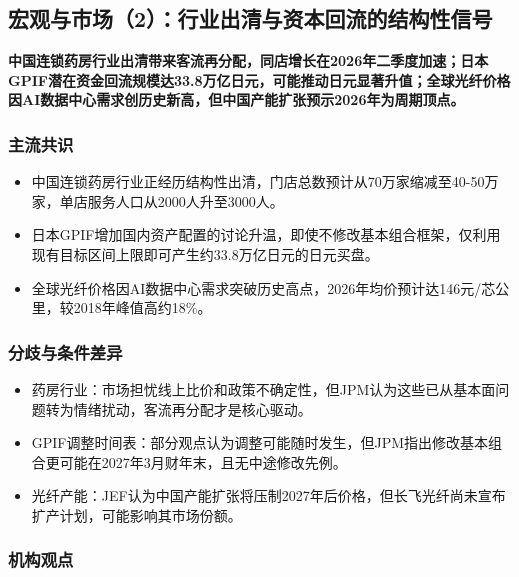 \documentclass[11pt]{ctexart}
\begin{document}
\subsection{宏观与市场（2）：行业出清与资本回流的结构性信号}
\textbf{中国连锁药房行业出清带来客流再分配，同店增长在2026年二季度加速；日本GPIF潜在资金回流规模达33.8万亿日元，可能推动日元显著升值；全球光纤价格因AI数据中心需求创历史新高，但中国产能扩张预示2026年为周期顶点。}
\subsubsection*{主流共识}
\begin{itemize}
  \item 中国连锁药房行业正经历结构性出清，门店总数预计从70万家缩减至40-50万家，单店服务人口从2000人升至3000人。
  \item 日本GPIF增加国内资产配置的讨论升温，即使不修改基本组合框架，仅利用现有目标区间上限即可产生约33.8万亿日元的日元买盘。
  \item 全球光纤价格因AI数据中心需求突破历史高点，2026年均价预计达146元/芯公里，较2018年峰值高约18\%。
\end{itemize}
\subsubsection*{分歧与条件差异}
\begin{itemize}
  \item 药房行业：市场担忧线上比价和政策不确定性，但JPM认为这些已从基本面问题转为情绪扰动，客流再分配才是核心驱动。
  \item GPIF调整时间表：部分观点认为调整可能随时发生，但JPM指出修改基本组合更可能在2027年3月财年末，且无中途修改先例。
  \item 光纤产能：JEF认为中国产能扩张将压制2027年后价格，但长飞光纤尚未宣布扩产计划，可能影响其市场份额。
\end{itemize}
\subsubsection*{机构观点}
\end{document}
